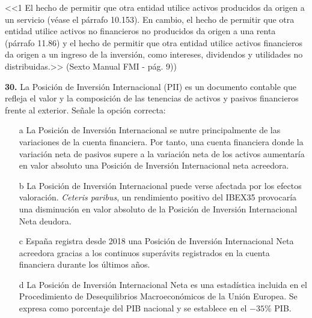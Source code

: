 \documentclass{nuevotema}
\begin{document}
\conceptos

<<1 El hecho de permitir que otra entidad utilice activos producidos da origen a un servicio (véase el párrafo 10.153). En cambio, el hecho de permitir que otra entidad utilice activos no financieros no producidos da origen a una renta (párrafo 11.86) y el hecho de permitir que otra entidad utilice activos financieros da origen a un ingreso de la inversión, como intereses, dividendos y utilidades no distribuidas.>> (Sexto Manual FMI - pág. 9))

\preguntas


\textbf{30.} La Posición de Inversión Internacional (PII) es un documento contable que refleja el valor y la composición de las tenencias de activos y pasivos financieros frente al exterior. Señale la opción correcta:

\begin{itemize}
	\item[a] La Posición de Inversión Internacional se nutre principalmente de las variaciones de la cuenta financiera. Por tanto, una cuenta financiera donde la variación neta de pasivos supere a la variación neta de los activos aumentaría en valor absoluto una Posición de Inversión Internacional neta acreedora.
	\item[b] La Posición de Inversión Internacional puede verse afectada por los efectos valoración. \textit{Ceteris paribus}, un rendimiento positivo del IBEX35 provocaría una disminución en valor absoluto de la Posición de Inversión Internacional Neta deudora.
	\item[c] España registra desde 2018 una Posición de Inversión Internacional Neta acreedora gracias a los continuos superávits registrados en la cuenta financiera durante los últimos años.
	\item[d] La Posición de Inversión Internacional Neta es una estadística incluida en el Procedimiento de Desequilibrios Macroeconómicos de la Unión Europea. Se expresa como porcentaje del PIB nacional y se establece en el $-35\%$ PIB.
\end{itemize}
\end{document}
